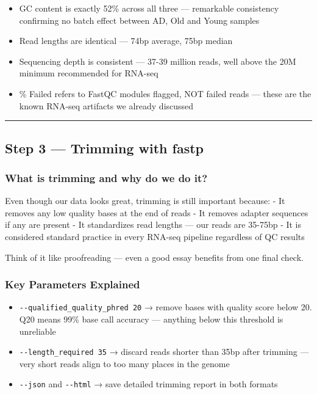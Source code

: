 \documentclass[
]{article}
\providecommand{\tightlist}{%
  \setlength{\itemsep}{0pt}\setlength{\parskip}{0pt}}
\begin{document}
\begin{itemize}
\tightlist
\item
  GC content is exactly 52\% across all three --- remarkable consistency
  confirming no batch effect between AD, Old and Young samples
\item
  Read lengths are identical --- 74bp average, 75bp median
\item
  Sequencing depth is consistent --- 37-39 million reads, well above the
  20M minimum recommended for RNA-seq
\item
  \% Failed refers to FastQC modules flagged, NOT failed reads --- these
  are the known RNA-seq artifacts we already discussed
\end{itemize}

\begin{center}\rule{0.5\linewidth}{0.5pt}\end{center}

\subsection{Step 3 --- Trimming with
fastp}\label{step-3-trimming-with-fastp}

\subsubsection{What is trimming and why do we do
it?}\label{what-is-trimming-and-why-do-we-do-it}

Even though our data looks great, trimming is still important because: -
It removes any low quality bases at the end of reads - It removes
adapter sequences if any are present - It standardizes read lengths ---
our reads are 35-75bp - It is considered standard practice in every
RNA-seq pipeline regardless of QC results

Think of it like proofreading --- even a good essay benefits from one
final check.

\subsubsection{Key Parameters Explained}\label{key-parameters-explained}

\begin{itemize}
\tightlist
\item
  \texttt{-\/-qualified\_quality\_phred\ 20} → remove bases with quality
  score below 20. Q20 means 99\% base call accuracy --- anything below
  this threshold is unreliable
\item
  \texttt{-\/-length\_required\ 35} → discard reads shorter than 35bp
  after trimming --- very short reads align to too many places in the
  genome
\item
  \texttt{-\/-json} and \texttt{-\/-html} → save detailed trimming
  report in both formats
\end{itemize}
\end{document}

